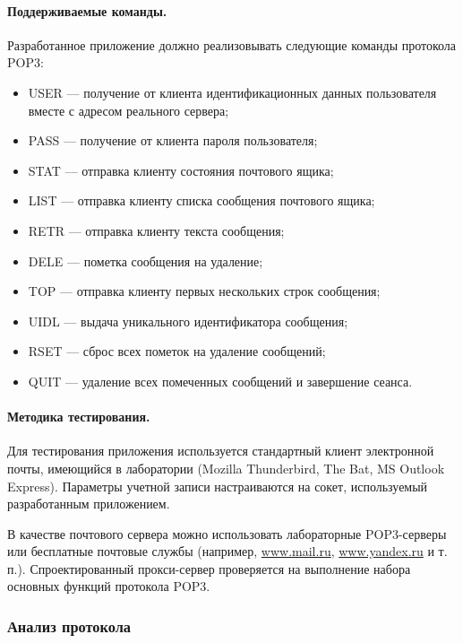 \paragraph{Поддерживаемые команды.} 

Разработанное приложение должно реализовывать следующие команды протокола POP3:

\begin{itemize}
	\item USER --– получение от клиента идентификационных данных пользователя вместе с адресом реального сервера;
	\item PASS --– получение от клиента пароля пользователя;
	\item STAT --– отправка клиенту состояния почтового ящика;
	\item LIST --– отправка клиенту списка сообщения почтового ящика;
	\item RETR --– отправка клиенту текста сообщения;
	\item DELE --– пометка сообщения на удаление;
	\item TOP --- отправка клиенту первых нескольких строк сообщения;
	\item UIDL --- выдача уникального идентификатора сообщения;
	\item RSET --- сброс всех пометок на удаление сообщений;
	\item QUIT --- удаление всех помеченных сообщений и завершение сеанса.
\end{itemize}

\paragraph{Методика тестирования.} 

Для тестирования приложения используется стандартный клиент электронной почты, имеющийся в лаборатории (Mozilla Thunderbird, The Bat, MS Outlook Express). Параметры учетной записи настраиваются на сокет, используемый разработанным приложением.

В качестве почтового сервера можно использовать лабораторные POP3-серверы или бесплатные почтовые службы (например, \href{http://www.mail.ru}{www.mail.ru}, \href{http://www.yandex.ru}{www.yandex.ru} и т. п.). Спроектированный прокси-сервер проверяется на выполнение набора основных функций протокола POP3.

\subsubsection{Анализ протокола}

